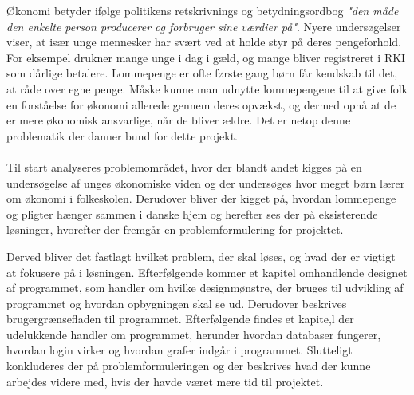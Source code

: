 Økonomi betyder ifølge politikens retskrivnings og betydningsordbog \textit{"den måde den enkelte person producerer og forbruger sine værdier på"}. Nyere undersøgelser viser, at især unge mennesker har svært ved at holde styr på deres pengeforhold. For eksempel drukner mange unge i dag i gæld, og mange bliver registreret i RKI som dårlige betalere.
Lommepenge er ofte første gang børn får kendskab til det, at råde over egne penge. Måske kunne man udnytte lommepengene til at give folk en forståelse for økonomi allerede gennem deres opvækst, og dermed opnå at de er mere økonomisk ansvarlige, når de bliver ældre. Det er netop denne problematik der danner bund for dette projekt.\\
\\
Til start analyseres problemområdet, hvor der blandt andet kigges på en undersøgelse af unges økonomiske viden og der undersøges hvor meget børn lærer om økonomi i folkeskolen. Derudover bliver der kigget på, hvordan lommepenge og pligter hænger sammen i danske hjem og herefter ses der på eksisterende løsninger, hvorefter der fremgår en problemformulering for projektet.

Derved bliver det fastlagt hvilket problem, der skal løses, og hvad der er vigtigt at fokusere på i løsningen. Efterfølgende kommer et kapitel omhandlende designet af programmet, som handler om hvilke designmønstre, der bruges til udvikling af programmet og hvordan opbygningen skal se ud. Derudover beskrives brugergrænsefladen til programmet. Efterfølgende findes et kapite,l der udelukkende handler om programmet, herunder hvordan databaser fungerer, hvordan login virker og hvordan grafer indgår i programmet. Slutteligt konkluderes der på problemformuleringen og der beskrives hvad der kunne arbejdes videre med, hvis der havde været mere tid til projektet. 

